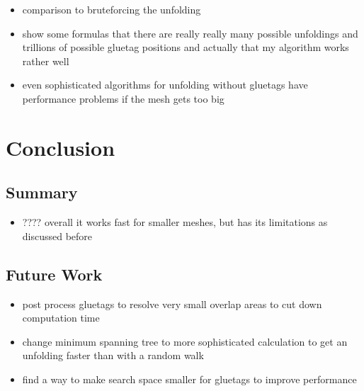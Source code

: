 \documentclass[draft,final]{vutinfth} %
\begin{document}
\begin{itemize}
	\item comparison to bruteforcing the unfolding
	\item show some formulas that there are really really many possible unfoldings and trillions of possible gluetag positions and actually that my algorithm works rather well
	\item even sophisticated algorithms for unfolding without gluetags have performance problems if the mesh gets too big
\end{itemize}

\chapter{Conclusion}

\section{Summary}

\begin{itemize}
	\item ???? overall it works fast for smaller meshes, but has its limitations as discussed before
\end{itemize}

\section{Future Work}

\begin{itemize}
	\item post process gluetags to resolve very small overlap areas to cut down computation time
	\item change minimum spanning tree to more sophisticated calculation to get an unfolding faster than with a random walk
	\item find a way to make search space smaller for gluetags to improve performance
\end{itemize}

\backmatter

\listoffigures %

\cleardoublepage %
\listoftables %

\listofalgorithms
{}

\printindex

\printglossaries



\end{document}
